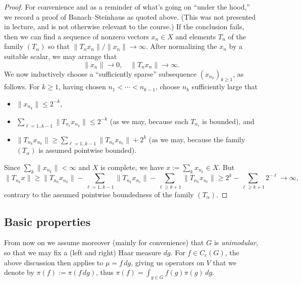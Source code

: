 \documentclass[reqno]{amsart} 
\begin{document}
\begin{proof}
  For convenience and as a reminder of what's going on ``under the hood,'' we record a proof of Banach--Steinhaus as quoted above.  (This was not presented in lecture, and is not otherwise relevant to the course.)  If the conclusion fails, then we can find a sequence of nonzero vectors $x_n \in X$ and elements $T_n$ of the family $(T_\alpha)$ so that $\|T_n x_n\|/ \|x_n\| \rightarrow \infty$.  After normalizing the $x_n$ by a suitable scalar, we may arrange that
  \begin{equation*}
    \| x_n\| \rightarrow 0, \quad \|T_n x_n\| \rightarrow \infty.
  \end{equation*}
  We now inductively choose a ``sufficiently sparse'' subsequence $(x_{n_k})_{k \geq 1}$, as follows.  For $k \geq 1$, having chosen $n_1 < \dotsb < n_{k-1}$, choose $n_{k}$ sufficiently large that
  \begin{itemize}
  \item $\|x_{n_{k}}\| \leq 2^{-k}$,
  \item $\sum_{\ell=1..k-1} \|T_{n_{\ell}} x_{n_{k}} \| \leq 2^{-k}$ (as we may, because each $T_{n_{\ell}}$ is bounded), and
  \item $\|T_{n_{k}} x_{n_{k}} \| \geq \sum_{\ell =1..k-1} \| T_{n_{k}} x_{n_{\ell}} \| + 2^{k}$ (as we may, because the family $(T_\alpha)$ is assumed pointwise bounded).
  \end{itemize}
  Since $\sum_{k} \|x_{n_k}\| < \infty$ and $X$ is complete, we have $x := \sum_k x_{n_k} \in X$.  But
  \begin{equation*}
    \|T_{n_k} x\| \geq \|T_{n_k} x_{n_k}\| - \sum_{\ell=1..k-1} \| T_{n_{k}} x_{n_{\ell}} \| - \sum_{\ell \geq k+1} \| T_{n_{k}} x_{n_{\ell}} \| \geq 2^k - \sum_{\ell \geq k+1} 2^{-\ell} \rightarrow \infty,
  \end{equation*}
  contrary to the assumed pointwise boundedness of the family $(T_\alpha)$.
\end{proof}

\subsection{Basic properties}
From now on we assume moreover (mainly for convenience) that $G$ is \emph{unimodular}, so that we may fix a (left and right) Haar measure $d g$.  For $f \in C_c(G)$, the above discussion then applies to $\mu = f \, d g$, giving us operators on $V$ that we denote by $\pi(f) := \pi(f \, d g)$, thus $\pi(f) = \int_{g \in G} f(g) \pi(g) \, d g$.
\end{document}
